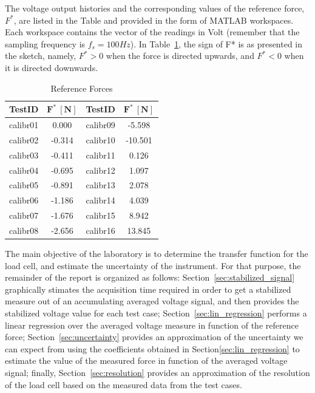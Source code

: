 \documentclass[12pt]{article}
\begin{document}
        The voltage output histories and the corresponding values of the reference force, \( F^* \), are listed in the Table and provided in the form of MATLAB workspaces. Each workspace contains the vector of the readings in Volt (remember that the sampling frequency is \( f_s = 100 H\!z \)). In Table~\ref{tab:data}, the sign of F* is as presented in the sketch, namely, \( F^* > 0 \) when the force is directed upwards, and \( F^* < 0 \) when it is directed downwards.

        \begin{table}[!ht]
                \label{tab:data}
                \begin{tabular}{|cc|cc|}
                        \hline
                        \textbf{TestID} & \( \pmb{F^* \: \left[ N \right]} \) & \textbf{TestID} & \( \pmb{F^* \: \left[ N \right]} \) \\ \hline
                        calibr01        & 0.000               & calibr09        & -5.598              \\
                        calibr02        & -0.314              & calibr10        & -10.501             \\
                        calibr03        & -0.411              & calibr11        & 0.126               \\
                        calibr04        & -0.695              & calibr12        & 1.097               \\
                        calibr05        & -0.891              & calibr13        & 2.078               \\
                        calibr06        & -1.186              & calibr14        & 4.039               \\
                        calibr07        & -1.676              & calibr15        & 8.942               \\
                        calibr08        & -2.656              & calibr16        & 13.845              \\ \hline
                \end{tabular}
                \centering
                \caption{Reference Forces}
        \end{table}

        The main objective of the laboratory is to determine the transfer function for the load cell, and estimate the uncertainty of the instrument. For that purpose, the remainder of the report is organized as follows: Section~\ref{sec:stabilized_signal} graphically stimates the acquisition time required in order to get a stabilized measure out of an accumulating averaged voltage signal, and then provides the stabilized voltage value for each test case; Section~\ref{sec:lin_regression} performs a linear regression over the averaged voltage measure in function of the reference force; Section~\ref{sec:uncertainty} provides an approximation of the uncertainty we can expect from using the coefficients obtained in Section\ref{sec:lin_regression} to estimate the value of the measured force in function of the averaged voltage signal; finally, Section~\ref{sec:resolution} provides an approximation of the resolution of the load cell based on the measured data from the test cases.
\end{document}
